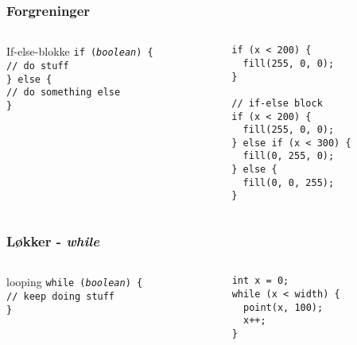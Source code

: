 \documentclass{beamer}
\begin{document}
\begin{frame}[fragile]
  \frametitle{Forgreninger}
  \begin{columns}
    \begin{column}{0.5\textwidth}
      \begin{block}{If-else-blokke}
        \texttt{if (\emph{boolean}) \{ }\\
        \texttt{// do stuff} \\
        \texttt{\} else \{ } \\
        \texttt{// do something else} \\
        \texttt{\}}\\
        \vspace{1cm}
      \end{block}
    \end{column}
    \begin{column}{0.5\textwidth}
\begin{verbatim} 
if (x < 200) {
  fill(255, 0, 0);
}

// if-else block
if (x < 200) {
  fill(255, 0, 0);
} else if (x < 300) {
  fill(0, 255, 0);
} else {
  fill(0, 0, 255);
}
\end{verbatim}
    \end{column}
  \end{columns}
\end{frame}


\begin{frame}[fragile]
  \frametitle{Løkker - \emph{while}}
  \begin{columns}
    \begin{column}{0.5\textwidth}
      \begin{block}{looping}
        \texttt{while (\emph{boolean}) \{ }\\
        \texttt{// keep doing stuff} \\
        \texttt{\}}\\
        \vspace{1cm}
      \end{block}
    \end{column}
    \begin{column}{0.5\textwidth}
\begin{verbatim} 
int x = 0;
while (x < width) {
  point(x, 100);
  x++;
}
\end{verbatim}
    \end{column}
  \end{columns}
\end{frame}
\end{document}

